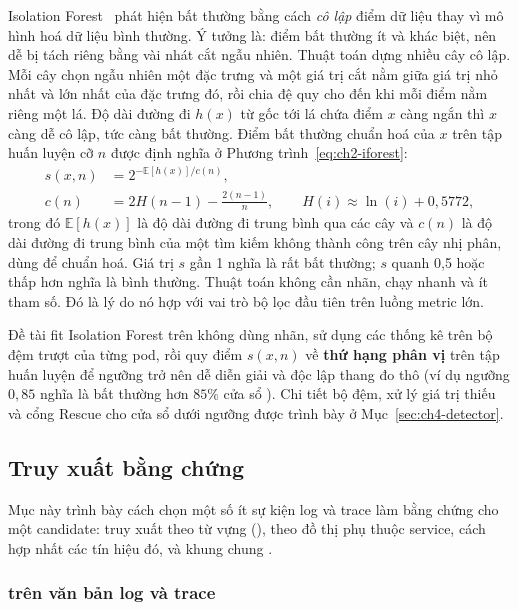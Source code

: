 Isolation Forest~\cite{isof} phát hiện bất thường bằng cách \emph{cô lập} điểm dữ liệu thay vì mô hình hoá dữ liệu bình thường. Ý tưởng là: điểm bất thường ít và khác biệt, nên dễ bị tách riêng bằng vài nhát cắt ngẫu nhiên. Thuật toán dựng nhiều cây cô lập. Mỗi cây chọn ngẫu nhiên một đặc trưng và một giá trị cắt nằm giữa giá trị nhỏ nhất và lớn nhất của đặc trưng đó, rồi chia đệ quy cho đến khi mỗi điểm nằm riêng một lá. Độ dài đường đi $h(x)$ từ gốc tới lá chứa điểm $x$ càng ngắn thì $x$ càng dễ cô lập, tức càng bất thường. Điểm bất thường chuẩn hoá của $x$ trên tập huấn luyện cỡ $n$ được định nghĩa ở Phương trình~\eqref{eq:ch2-iforest}:
\begin{align}
  s(x, n) &= 2^{-\mathbb{E}[h(x)] / c(n)}, \nonumber \\
  c(n) &= 2 H(n - 1) - \frac{2(n - 1)}{n}, \qquad H(i) \approx \ln(i) + 0{,}5772,
  \label{eq:ch2-iforest}
\end{align}
trong đó $\mathbb{E}[h(x)]$ là độ dài đường đi trung bình qua các cây và $c(n)$ là độ dài đường đi trung bình của một tìm kiếm không thành công trên cây nhị phân, dùng để chuẩn hoá. Giá trị $s$ gần 1 nghĩa là rất bất thường; $s$ quanh 0,5 hoặc thấp hơn nghĩa là bình thường. Thuật toán không cần nhãn, chạy nhanh và ít tham số. Đó là lý do nó hợp với vai trò bộ lọc đầu tiên trên luồng metric lớn.

Đề tài fit Isolation Forest trên  không dùng nhãn, sử dụng các thống kê trên bộ đệm trượt của từng pod, rồi quy điểm $s(x, n)$ về \textbf{thứ hạng phân vị} trên tập huấn luyện để ngưỡng trở nên dễ diễn giải và độc lập thang đo thô (ví dụ ngưỡng $0{,}85$ nghĩa là bất thường hơn $85\%$ cửa sổ ). Chi tiết bộ đệm, xử lý giá trị thiếu và cổng Rescue cho cửa sổ dưới ngưỡng được trình bày ở Mục~\ref{sec:ch4-detector}.

\subsection{Truy xuất bằng chứng}
\label{sec:ch2-truy-xuat}

Mục này trình bày cách chọn một số ít sự kiện log và trace làm bằng chứng cho một candidate: truy xuất theo từ vựng (), theo đồ thị phụ thuộc service, cách hợp nhất các tín hiệu đó, và khung chung .

\subsubsection{ trên văn bản log và trace}
\label{sec:ch2-bm25}

